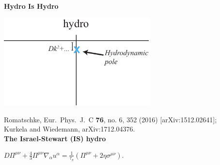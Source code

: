 \documentclass[9pt,a4paper,unknownkeysallowed,xcolor=dvipsnames,aspectratio=43]{beamer}
\begin{document}
%
%
%
\begin{frame}{\bf\huge Hydro Is Hydro}
\setcounter{page}{5}
\vspace{4mm}
\begin{center}
\includegraphics[width=0.6\textwidth]{fig/omega_hydro}
\end{center}
{\tiny  {\color{white} Romatschke,
  Eur.\ Phys.\ J.\ C {\bf 76}, no. 6, 352 (2016)
  [arXiv:1512.02641];\\Kurkela and Wiedemann,
  arXiv:1712.04376.
  }
  }\vspace{4mm}\\
{{\LARGE\bf\color{white}The Israel-Stewart (IS) hydro}}
\vspace{4mm}
\begin{center}
{\color{white}$D\Pi^{\mu\nu}+\frac{4}{3}\Pi^{\mu\nu}\nabla_\alpha u^\alpha = \frac{1}{\tau_\pi}\left(\Pi^{\mu\nu}+2 \eta\sigma^{\mu\nu}\right).$}
\end{center}
 \end{frame}
%
%
%
\end{document}
